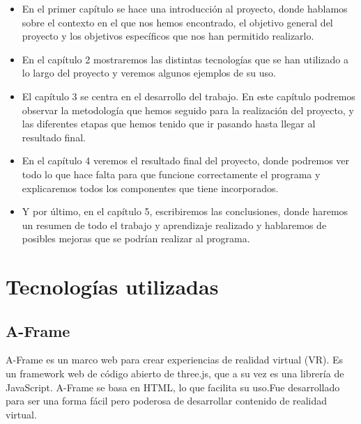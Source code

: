\documentclass[a4paper, 12pt]{book}
\begin{document}
\begin{itemize}
    \item En el primer capítulo se hace una introducción al proyecto, donde hablamos sobre el contexto en el que nos hemos encontrado, el objetivo general del proyecto y los objetivos específicos que nos han permitido realizarlo.

    \item En el capítulo 2 mostraremos las distintas tecnologías que se han utilizado a lo largo del proyecto y veremos algunos ejemplos de su uso.

    \item El capítulo 3 se centra en el desarrollo del trabajo. En este capítulo podremos observar la metodología que hemos seguido para la realización del proyecto, y las diferentes etapas que hemos tenido que ir pasando hasta llegar al resultado final.

    \item En el capítulo 4 veremos el resultado final del proyecto, donde podremos ver todo lo que hace falta para que funcione correctamente el programa y explicaremos todos los componentes que tiene incorporados.

    \item Y por último, en el capítulo 5, escribiremos las conclusiones, donde haremos un resumen de todo el trabajo y aprendizaje realizado y hablaremos de posibles mejoras que se podrían realizar al programa.

\end{itemize}






\cleardoublepage
\chapter{Tecnologías utilizadas}
\label{chap:tecnologias}


\section{A-Frame}
\label{sec:A-Frame}
A-Frame es un marco web para crear experiencias de realidad virtual (VR). Es un framework web de código abierto de three.js, que a su vez es una librería de JavaScript.
A-Frame se basa en HTML, lo que facilita su uso.Fue desarrollado para ser una forma fácil pero poderosa de desarrollar contenido de realidad virtual.
\end{document}
